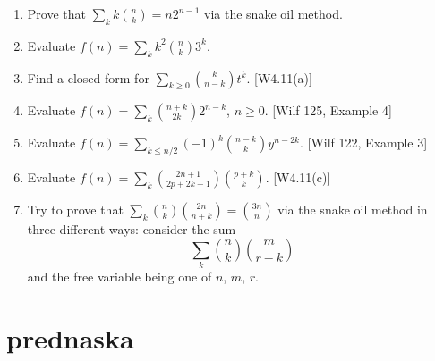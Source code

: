 \documentclass[10pt, a4paper]{article}
\newcommand*\ruleline[1]{\par\noindent\raisebox{.8ex}{\makebox[\linewidth]{\hrulefill\hspace{1ex}\raisebox{-.8ex}{#1}\hspace{1ex}\hrulefill}}}
\def\ans#1{\big[\hskip 2mm {#1}\hskip 2mm\big]}
\begin{document}
\ruleline{Exercises}
\begin{enumerate}
    \item Prove that $\sum_k k{n\choose k} = n2^{n-1}$ via the snake oil method.
            \ans{$L(x) = P(x) = {x\over (1-2x)^2}$}
    \item Evaluate $\displaystyle f(n)=\sum_k k^2{n\choose k}3^k$. \\[2mm]
            \ans{$F(x)={3x(1+2x)\over (1-4x)^3}={3/8\over 1-4x}-{3/2\over (1-4x)^2}+{9/8\over (1-4x)^3}$; $f(n)=3\cdot 4^{n-2}\cdot n(1+3n)$}
    \item Find a closed form for $\displaystyle \sum_{k\ge 0} {k\choose n-k}t^k$. [W4.11(a)] \\[2mm]
            \ans{$F(x)=1/(1-tx-tx^2)$}
    \item Evaluate $\displaystyle f(n)=\sum_k {n+k\choose 2k}2^{n-k}$, $n\ge 0$. [Wilf 125, Example 4] \\[2mm]
            \ans{$F(x)={1-2x\over (1-x)(1-4x)}={2\over 3(1-4x)}+{1\over 3(1-x)}$; $f(n)=(2^{2n+1}+1)/3$}
    \item Evaluate $\displaystyle f(n)=\sum_{k\le n/2} (-1)^k{n-k\choose k}y^{n-2k}$. [Wilf 122, Example 3]\\[2mm]
            \ans{$F(x)=1/(1-xy+x^2)$}
    \item Evaluate $\displaystyle f(n)=\sum_{k} {2n+1\choose 2p+2k+1}{p+k\choose k}$. [W4.11(c)]\\[2mm]
            \ans{replace $2n+1$ by $m$ and solve for $f(m)={m-p-1\choose p}2^{m-2p-1}$;  $f(2n+1)={2n-p\choose p}4^{n-p}$;\\[2mm]
                    $\displaystyle F(x) = {x\over (1-x)^2}\sum_{k\ge 0} {p+k\choose p} \left({x\over 1-x}\right)^{2(p+k)}
                    ={x^{p+1}\over 2^p}\cdot {(2x)^p\over (1-2x)^{p+1}}$}
    \item Try to prove that $\sum_k {n\choose k}{2n\choose n+k}={3n\choose n}$ via the snake oil method in three different ways: consider the sum
            $$\sum_k {n\choose k}{m\choose r-k}$$
            and the free variable being one of $n$, $m$, $r$.

\end{enumerate}



\newpage


\section{prednaska}
\end{document}
